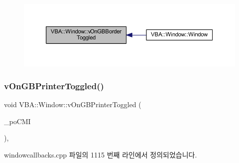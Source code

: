 \nopagebreak
\begin{figure}[H]
\begin{center}
\leavevmode
\includegraphics[width=350pt]{class_v_b_a_1_1_window_aa7cf1b717713eb050de751b12ddfe72a_icgraph}
\end{center}
\end{figure}
\mbox{\label{class_v_b_a_1_1_window_a2d6e4c0bd7467305b02bd6f5b0343f26}} 
\subsubsection{\texorpdfstring{v\+On\+G\+B\+Printer\+Toggled()}{vOnGBPrinterToggled()}}
{\footnotesize\ttfamily void V\+B\+A\+::\+Window\+::v\+On\+G\+B\+Printer\+Toggled (\begin{DoxyParamCaption}\item[{Gtk\+::\+Check\+Menu\+Item $\ast$}]{\+\_\+po\+C\+MI }\end{DoxyParamCaption})\hspace{0.3cm}{\ttfamily [protected]}, {\ttfamily [virtual]}}



windowcallbacks.\+cpp 파일의 1115 번째 라인에서 정의되었습니다.


